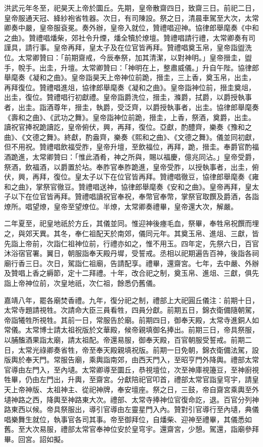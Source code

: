 洪武元年冬至，祀昊天上帝於圜丘。先期，皇帝散齋四日，致齋三日。前祀二日，皇帝服通天冠、絳紗袍省牲器。次日，有司陳設。祭之日，清晨車駕至大次，太常卿奏中嚴，皇帝服袞冕。奏外辦，皇帝入就位，贊禮唱迎神。協律郎舉麾奏《中和之曲》。贊禮唱燔柴，郊社令升煙，燔全犢於燎壇。贊禮唱請行禮，太常卿奏有司謹具，請行事。皇帝再拜，皇太子及在位官皆再拜。贊禮唱奠玉帛，皇帝詣盥洗位。太常卿贊曰：「前期齋戒，今辰奉祭，加其清潔，以對神明。」皇帝搢圭，盥手，帨手。出圭，升壇。太常卿贊曰：「神明在上，整肅威儀。」升自午陛。協律郎舉麾奏《凝和之曲》。皇帝詣昊天上帝神位前跪，搢圭，三上香，奠玉帛，出圭，再拜復位。贊禮唱進俎，協律郎舉麾奏《凝和之曲》。皇帝詣神位前，搢圭奠俎，出圭，復位。贊禮唱行初獻禮。皇帝詣爵洗位，搢圭，滌爵，拭爵，以爵授執事者，出圭。詣酒尊年，搢圭，執爵，受泛齊，以爵授執事者，出圭。協律郎舉麾奏《壽和之曲》、《武功之舞》。皇帝詣神位前跪，搢圭，上香，祭酒，奠爵，出圭。讀祝官捧祝跪讀訖，皇帝俯伏，興，再拜，復位。亞獻，酌醴齊，樂奏《豫和之曲》、《文德之舞》。終獻，酌盎齊，樂奏《熙和之曲》、《文德之舞》。儀並同初獻，但不用祝。贊禮唱飲福受胙，皇帝升壇，至飲福位，再拜，跪，搢圭。奉爵官酌福酒跪進，太常卿贊曰：「惟此酒肴，神之所與，賜以福慶，億兆同沾。」皇帝受爵，祭酒，飲福酒，以爵置於坫。奉胙官奉胙跪進，皇帝受胙，以授執事者，出圭，俯伏，興，再拜，復位。皇太子以下在位官皆再拜。贊禮唱徹豆，協律郎舉麾奏《雍和之曲》，掌祭官徹豆。贊禮唱送神，協律郎舉麾奏《安和之曲》。皇帝再拜，皇太子以下在位官皆再拜。贊禮唱讀祝官奉祝，奉幣官奉幣，掌祭官取饌及爵酒，各詣燎所。唱望燎，皇帝至望燎位。半燎，太常卿奏禮畢，皇帝還大次，解嚴。

二年夏至，祀皇地祇於方丘，其儀並同。惟迎神後瘞毛血，祭畢，奉牲帛祝饌而埋之，與郊天異。其冬，奉仁祖配天於南郊，儀同元年。其奠玉帛、進俎、三獻，皆先詣上帝前，次詣仁祖神位前，行禮亦如之，惟不用玉。四年定，先祭六日，百官沐浴宿官署。翼日，朝服詣奉天殿丹墀，受誓戒。丞相以祀期遍告百神，後詣各祠廟行香三日。次日，駕詣仁祖廟，告請配享。禮畢，還齋宮。七年，去中嚴、外辦及贊唱上香之縟節，定十二拜禮。十年，改合祀之制，奠玉帛、進俎、三獻，俱先詣上帝神位前，次皇地祇，次仁祖，餘悉仍舊儀。

嘉靖八年，罷各廟焚香禮。九年，復分祀之制，禮部上大祀圓丘儀注：前期十日，太常寺題請視牲。次請命大臣三員看牲，四員分獻。前期五日，錦衣衛備隨朝駕，帝詣犧牲所視牲。其前一日，常服告於廟。前期四日，御奉天殿，太常寺進銅人如常儀。太常博士請太祖祝版於文華殿，候帝親填御名捧出。前期三日，帝具祭服，以脯醢酒果詣太廟，請太祖配。帝還易服，御奉天殿，百官朝服受誓戒。前期二日，太常光祿卿奏省牲，帝至奉天殿親填祝版。前期一日免朝，錦衣衛備法駕，設版輿於奉天門。常服告廟，乘輿詣南郊，由西天門入，至昭亨門外降輿。禮部太常官導由左門入，至內壝。太常卿導至圜丘，恭視壇位，次至神庫視籩豆，至神廚視牲畢，仍由左門出，升輿，至齋宮。分獻陪祀官叩首，禮部太常官詣皇穹宇，請皇天上帝神版、太祖神主、從祀神牌，奉安壇座。祭之日，三鼓，帝自齋宮乘輿至外壝神路之西，降輿至神路東大次。禮部、太常寺捧神位官復命訖，退。百官分列神路東西以候。帝具祭服出，導引官導由左靈星門入內。贊對引官導行至內壝，典儀唱樂舞生就位，執事官各司其事。帝至御拜位，自燔柴、迎神至禮畢，其儀悉如舊。至大次易服，禮部太常官奉神位安於皇穹宇。還齋宮，少憩。駕還，詣廟參拜畢。回宮。詔如擬。

